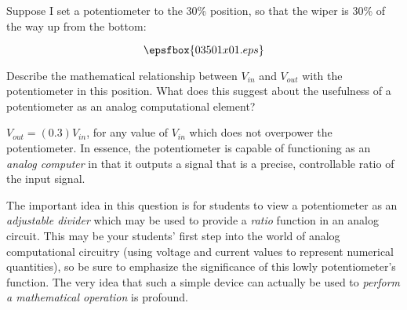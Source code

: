 

Suppose I set a potentiometer to the 30\% position, so that the wiper is 30\% of the way up from the bottom:

$$\epsfbox{03501x01.eps}$$

Describe the mathematical relationship between $V_{in}$ and $V_{out}$ with the potentiometer in this position.  What does this suggest about the usefulness of a potentiometer as an analog computational element?







$V_{out} = (0.3)V_{in}$, for any value of $V_{in}$ which does not overpower the potentiometer.  In essence, the potentiometer is capable of functioning as an {\it analog computer} in that it outputs a signal that is a precise, controllable ratio of the input signal.







The important idea in this question is for students to view a potentiometer as an {\it adjustable divider} which may be used to provide a {\it ratio} function in an analog circuit.  This may be your students' first step into the world of analog computational circuitry (using voltage and current values to represent numerical quantities), so be sure to emphasize the significance of this lowly potentiometer's function.  The very idea that such a simple device can actually be used to {\it perform a mathematical operation} is profound.




